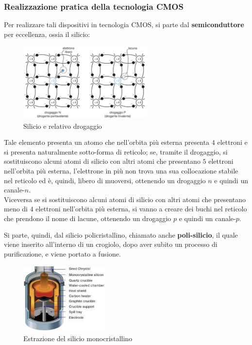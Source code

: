 \documentclass[a4paper]{extarticle}
\begin{document}
\vspace{1em}
\noindent
\subsubsection{Realizzazione pratica della tecnologia CMOS}
Per realizzare tali dispositivi in tecnologia CMOS, si parte dal \textbf{semiconduttore} per eccellenza, ossia il silicio:

\begin{figure}[H]
    \centering
    \includegraphics[width=0.6\textwidth]{semiconduttore.png}
    \caption{Silicio e relativo drogaggio}
    \label{fig:silicio_drogaggio}
\end{figure}

\noindent
Tale elemento presenta un atomo che nell'orbita più esterna presenta $4$ elettroni e si presenta naturalmente sotto-forma di reticolo; se, tramite il drogaggio, si sostituiscono alcuni atomi di silicio con altri atomi che presentano $5$ elettroni nell'orbita più esterna, l'elettrone in più non trova una sua collocazione stabile nel reticolo ed è, quindi, libero di muoversi, ottenendo un drogaggio $n$ e quindi un canale-$n$.\\
Viceversa se si sostituiscono alcuni atomi di silicio con altri atomi che presentano meno di $4$ elettroni nell'orbita più esterna, si vanno a creare dei buchi nel reticolo che prendono il nome di lacune, ottenendo un drogaggio $p$ e quindi un canale-$p$.

\vspace{1em}
\noindent
Si parte, quindi, dal silicio policristallino, chiamato anche \textbf{poli-silicio}, il quale viene inserito all'interno di un crogiolo, dopo aver subito un processo di purificazione, e viene portato a fusione.

\begin{figure}[H]
    \centering
    \includegraphics[width=0.4\textwidth]{estrazione-silicio-monocristallino.png}
    \caption{Estrazione del silicio monocristallino}
    \label{fig:estrazione_silicio_monocristallino}
\end{figure}
\end{document}
